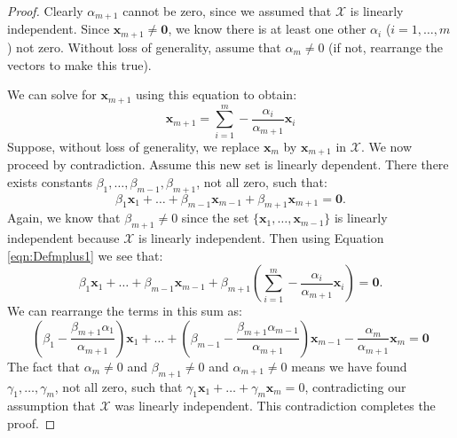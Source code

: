 \begin{proof} Clearly $\alpha_{m+1}$ cannot be zero, since we assumed that $\mathcal{X}$ is linearly independent. Since $\mathbf{x}_{m+1} \neq \mathbf{0}$, we know there is at least one other $\alpha_i$ ($i=1,\dots,m$) not zero. Without loss of generality, assume that $\alpha_m \neq 0$ (if not, rearrange the vectors to make this true).

We can solve for $\mathbf{x}_{m+1}$ using this equation to obtain:
\begin{equation}
\mathbf{x}_{m+1} = \sum_{i=1}^{m}-\frac{\alpha_i}{\alpha_{m+1}}\mathbf{x}_i
\label{eqn:Defmplus1}
\end{equation}
Suppose, without loss of generality, we replace $\mathbf{x}_{m}$ by $\mathbf{x}_{m+1}$ in $\mathcal{X}$. We now proceed by contradiction. Assume this new set is linearly dependent. There there exists constants $\beta_1,\dots,\beta_{m-1},\beta_{m+1}$, not all zero, such that:
\begin{equation}
\beta_1\mathbf{x}_1 + \dots + \beta_{m-1}\mathbf{x}_{m-1} + \beta_{m+1}\mathbf{x}_{m+1} = \mathbf{0}.
\label{eqn:Important}
\end{equation}
Again, we know that $\beta_{m+1} \neq 0$ since the set $\{\mathbf{x}_1,\dots,\mathbf{x}_{m-1}\}$ is linearly independent because $\mathcal{X}$ is linearly independent.
Then using Equation \ref{eqn:Defmplus1} we see that:
\begin{equation}
\beta_1\mathbf{x}_1 + \dots + \beta_{m-1}\mathbf{x}_{m-1} + \beta_{m+1}\left(\sum_{i=1}^{m}-\frac{\alpha_i}{\alpha_{m+1}}\mathbf{x}_i\right) = \mathbf{0}.
\end{equation}
We can rearrange the terms in this sum as:
\begin{equation}
\left(\beta_1 - \frac{\beta_{m+1}\alpha_1}{\alpha_{m+1}}\right)\mathbf{x}_{1} + \dots + 
\left(\beta_{m-1} - \frac{\beta_{m+1}\alpha_{m-1}}{\alpha_{m+1}}\right)\mathbf{x}_{m-1} - \frac{\alpha_m}{\alpha_{m+1}}\mathbf{x}_{m}
= \mathbf{0}
\end{equation}
The fact that $\alpha_m \neq 0$ and $\beta_{m+1} \neq 0$ and $\alpha_{m+1} \neq 0$ means we have found $\gamma_1,\dots,\gamma_m$, not all zero, such that $\gamma_1\mathbf{x}_1 + \dots + \gamma_m \mathbf{x}_m = 0$, contradicting our assumption that $\mathcal{X}$ was linearly independent. This contradiction completes the proof.
\end{proof}

